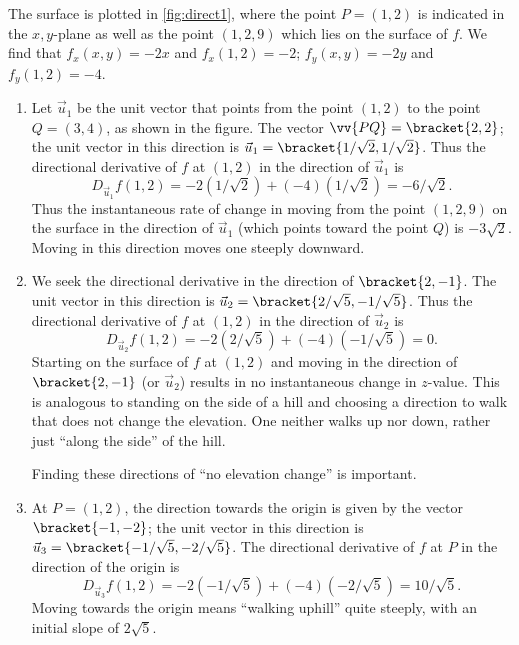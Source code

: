 {
The surface is plotted in \autoref{fig:direct1}, where the point $P=(1,2)$ is indicated in the $x,y$-plane as well as the point $(1,2,9)$ which lies on the surface of $f$. We find that $f_x(x,y) = -2x$ and $f_x(1,2) = -2$; $f_y(x,y) = -2y$ and $f_y(1,2) = -4$. 
\begin{enumerate}
	\item Let $\vec u_1$ be the unit vector that points from the point $(1,2)$ to the point $Q=(3,4)$, as shown in the figure. The vector $\vv{PQ} =\bracket{2,2}$; the unit vector in this direction is $\vec u_1=\bracket{1/\sqrt{2}, 1/\sqrt{2}}$. Thus the directional derivative of $f$ at $(1,2)$ in the direction of $\vec u_1$ is
	\[D_{\vec u_1}f(1,2) = -2(1/\sqrt{2}) +(-4)(1/\sqrt{2}) = -6/\sqrt{2}%
	.\]
	Thus the instantaneous rate of change in moving from the point $(1,2,9)$ on the surface in the direction of $\vec u_1$ (which points toward the point $Q$) is $-3\sqrt2$. Moving in this direction moves one steeply downward.
	
	\item		We seek the directional derivative in the direction of $\bracket{2,-1}$. The unit vector in this direction is $\vec u_2 =\bracket{2/\sqrt{5},-1/\sqrt{5}}$. Thus the directional derivative of $f$ at $(1,2)$ in the direction of $\vec u_2$ is
	\[D_{\vec u_2}f(1,2) = -2(2/\sqrt{5})+(-4)(-1/\sqrt{5}) = 0.\]
	Starting on the surface of $f$ at $(1,2)$ and moving in the direction of $\bracket{2,-1}$ (or $\vec u_2$) results in no instantaneous change in $z$-value. This is analogous to standing on the side of a hill and choosing a direction to walk that does not change the elevation. One neither walks up nor down, rather just ``along the side'' of the hill.
	
	Finding these directions of ``no elevation change'' is important.
	
	\item		At $P=(1,2)$, the direction towards the origin is given by the vector $\bracket{-1,-2}$; the unit vector in this direction is $\vec u_3=\bracket{-1/\sqrt{5},-2/\sqrt{5}}$. The directional derivative of $f$ at $P$ in the direction of the origin is
	\[D_{\vec u_3}f(1,2) = -2(-1/\sqrt{5}) + (-4)(-2/\sqrt{5}) = 10/\sqrt{5}%
	.\]
	Moving towards the origin means ``walking uphill'' quite steeply, with an initial slope of $2\sqrt5$.\eoehere
\end{enumerate}}

